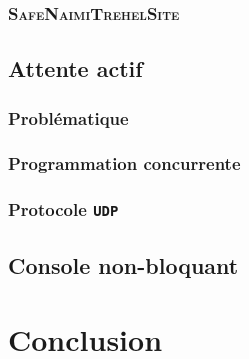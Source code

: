 \documentclass[a4paper,french,towsides,10pt]{book}
\begin{document}
\subsection{\textsc{SafeNaimiTrehelSite}}


\section{Attente actif}
\subsection{Problématique}

\subsection{Programmation concurrente}

\subsection{Protocole \texttt{UDP}}

\section{Console non-bloquant}


\chapter*{Conclusion}
\end{document}
